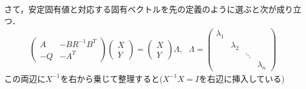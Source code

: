 さて，安定固有値と対応する固有ベクトルを先の定義のように選ぶと次が成り立つ．
\begin{align}
	\left(\begin{array}{cc}
	       A  & - B R^{-1} B^T \\
	       -Q & - A^T
	\end{array}\right)
		 \left(\begin{array}{c}
		      X \\
		      Y
		\end{array}\right)
	= 
		 \left(\begin{array}{cccc}
		      X \\
		      Y
		\end{array}\right)
		\Lambda
		, \ \ \ 
		\Lambda =
		 \left(\begin{array}{cccc}
		      \lambda_1 & & &  \\
		      & \lambda_2 & &  \\
		      & & \ddots    &  \\
		      & & & \lambda_n 
		\end{array}\right)
\end{align}
この両辺に$X^{-1}$を右から乗じて整理すると($X^{-1}X =I$を右辺に挿入している)
